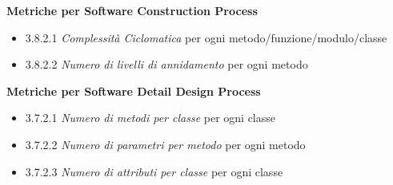 \textbf{Metriche per Software Construction Process}
\begin{itemize}
	\item 3.8.2.1  \textit{Complessità Ciclomatica}  per ogni metodo/funzione/modulo/classe
	\item 3.8.2.2  \textit{Numero di livelli di annidamento}  per ogni metodo
\end{itemize}


\textbf{Metriche per Software Detail Design Process}
\begin{itemize}
	\item 3.7.2.1 \textit{Numero di metodi per classe} per ogni classe
	\item 3.7.2.2  \textit{Numero di parametri per metodo} per ogni metodo
	\item 3.7.2.3  \textit{Numero di attributi per classe} per ogni classe
\end{itemize}